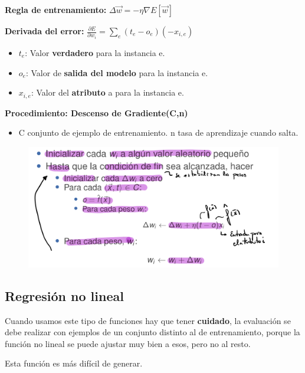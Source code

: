 \documentclass[12pt]{report} %
\begin{document}
\textbf{Regla de entrenamiento:}
\(\Delta \vec{w}=-\eta \nabla E[\vec{w}]\)

\textbf{Derivada del error:}
\(\frac{\partial E}{\partial w_{i}}=\sum_{e}\left(t_{e}-o_{e}\right)\left(-x_{i, e}\right)\)

\begin{itemize}

\item
  \(t_e\): Valor \textbf{verdadero} para la instancia e.
\item
  \(o_e\): Valor de \textbf{salida del modelo} para la instancia e.
\item
  \(x_{i,e}\): Valor del \textbf{atributo} a para la instancia e.
\end{itemize}
\pagebreak
\textbf{Procedimiento: Descenso de Gradiente(C,n)}

\begin{itemize}

\item
  C conjunto de ejemplo de entrenamiento. n tasa de aprendizaje cuando
  salta.
\end{itemize}

\begin{figure}[H]
	{\includegraphics[scale=.2]{image-20210305224415026.png}}
\end{figure}

\subsection{Regresión no lineal}

Cuando usamos este tipo de funciones hay que tener \textbf{cuidado}, la
evaluación se debe realizar con ejemplos de un conjunto distinto al de
entrenamiento, porque la función no lineal se puede ajustar muy bien a
esos, pero no al resto.

Esta función es más difícil de generar.
\end{document}
